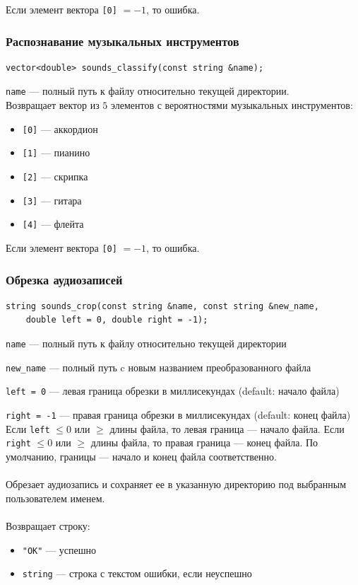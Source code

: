 \documentclass[14pt,a4paper]{article}
\begin{document}
\noindent Если элемент вектора \lstinline{[0]} $= -1$, то ошибка.

\subsubsection*{Распознавание музыкальных инструментов}

\begin{lstlisting}
vector<double> sounds_classify(const string &name);
\end{lstlisting}

\lstinline{name} --- полный путь к файлу относительно текущей директории. \\

\noindent Возвращает вектор из $5$ элементов с вероятностями музыкальных инструментов:
\smallskip 
\begin{itemize}
\item[] \lstinline{[0]} --- аккордион
\item[] \lstinline{[1]} --- пианино
\item[] \lstinline{[2]} --- скрипка
\item[] \lstinline{[3]} --- гитара
\item[] \lstinline{[4]} --- флейта
\end{itemize}

\noindent Если элемент вектора \lstinline{[0]} $= -1$, то ошибка.

\subsubsection*{Обрезка аудиозаписей}

\begin{lstlisting}
string sounds_crop(const string &name, const string &new_name, 
	double left = 0, double right = -1);
\end{lstlisting}

\lstinline{name} --- полный путь к файлу относительно текущей директории \par
\lstinline{new_name} --- полный путь c новым названием преобразованного файла \par
\lstinline{left = 0} --- левая граница обрезки в миллисекундах (default: начало файла) \par
\lstinline{right = -1} --- правая граница обрезки в миллисекундах (default: конец файла) \\

\noindent Если \lstinline{left} $\leq 0$ или $\geq$ длины файла, то левая граница --- начало файла. Если \lstinline{right} $\leq 0$ или $\geq$ длины файла, то правая граница --- конец файла. По умолчанию, границы --- начало и конец файла соответственно. \\\\
Обрезает аудиозапись и сохраняет ее в указанную директорию под выбранным пользователем именем. \\\\
Возвращает строку:
\smallskip
\begin{itemize}
\item \lstinline{"OK"} --- успешно
\item \lstinline{string} --- строка с текстом ошибки, если неуспешно
\end{itemize}
\end{document}
